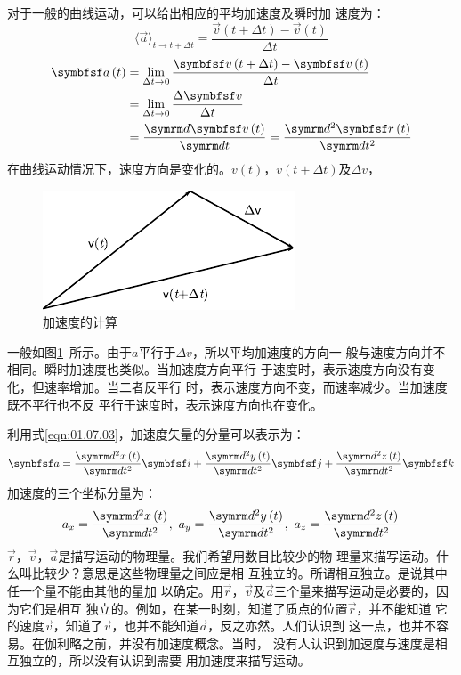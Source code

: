 对于一般的曲线运动，可以给出相应的平均加速度及瞬时加
速度为：
\begin{equation}\label{eqn:01.08.02}
    \langle \vec{a} \rangle_{t \rightarrow t+\Delta t} = \frac{\vec{v}\left(t+\Delta t\right)-\vec{v}\left(t\right)}{\Delta t}
\end{equation}
\begin{equation}\label{eqn:01.08.03}
    \begin{aligned}
        \vec{a}\left(t\right) & =\lim _{\Delta t \rightarrow 0} \frac{\vec{v}\left(t+\Delta t\right)-\vec{v}\left(t\right)}{\Delta t} \\
                  & =\lim_{\Delta t \rightarrow 0}\frac{\Delta \vec{v}}{\Delta t}                  \\
                  & =\frac{\dif\vec{v}\left(t\right)}{\dif t}=\frac{\dif^2 \vec{r}\left(t\right)}{\dif t^2}
    \end{aligned}
\end{equation}
在曲线运动情况下，速度方向是变化的。$v\left(t\right)$，$v\left(t+\Delta t\right)$及$\Delta v$，
\begin{figure}
    \centering
    \small
    \includegraphics{figure/fig01.14}
    \caption{加速度的计算}
    \label{fig:01.14}
\end{figure}
一般如图\ref{fig:01.14}~所示。由于$a$平行于$\Delta v$，所以平均加速度的方向一
般与速度方向并不相同。瞬时加速度也类似。当加速度方向平行
于速度时，表示速度方向没有变化，但速率增加。当二者反平行
时，表示速度方向不变，而速率减少。当加速度既不平行也不反
平行于速度时，表示速度方向也在变化。

利用式\eqref{eqn:01.07.03}，加速度矢量的分量可以表示为：
\begin{equation}\label{eqn:01.08.04}
    \vec{a}=\frac{\dif^2x\left(t\right)}{\dif t^2}\vec{i}+\frac{\dif^2y\left(t\right)}{\dif t^2}\vec{j}+\frac{\dif^2z\left(t\right)}{\dif t^2}\vec{k}
\end{equation}
加速度的三个坐标分量为：
\begin{equation}\label{eqn:01.08.05}
    a_x=\frac{\dif^2x\left(t\right)}{\dif t^2},~ a_y=\frac{\dif^2y\left(t\right)}{\dif t^2},~
    a_z=\frac{\dif^2z\left(t\right)}{\dif t^2}
\end{equation}
$\vec{r}$，$\vec{v}$，$\vec{a}$是描写运动的物理量。我们希望用数目比较少的物
理量来描写运动。什么叫比较少？意思是这些物理量之间应是相
互独立的。所谓相互独立。是说其中任一个量不能由其他的量加
以确定。用$\vec{r}$，$\vec{v}$及$\vec{a}$三个量来描写运动是必要的，因为它们是相互
独立的。例如，在某一时刻，知道了质点的位置$\vec{r}$，并不能知道
它的速度$\vec{v}$，知道了$\vec{v}$，也并不能知道$\vec{a}$，反之亦然。人们认识到
这一点，也并不容易。在伽利略之前，并没有加速度概念。当时，
没有人认识到加速度与速度是相互独立的，所以没有认识到需要
用加速度来描写运动。

